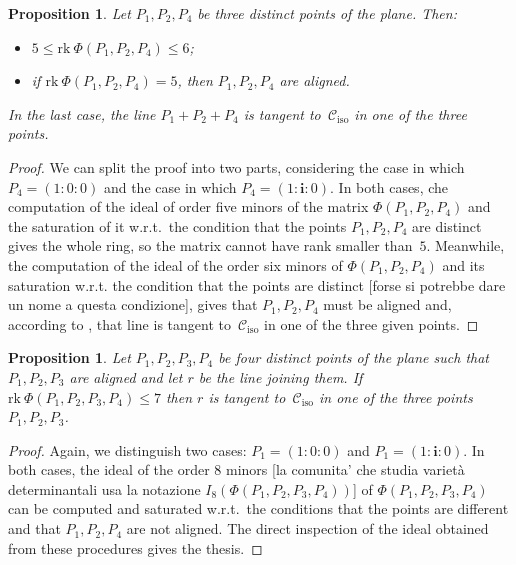 \documentclass[11pt, a4paper, reqno, captions=tableheading,bibliography=totoc]{scrartcl}
\theoremstyle{plain}
\newtheorem{prop}[lemma]{Proposition}
\theoremstyle{definition}
\newcommand{\iso}{\mathcal{C}_{\mathrm{iso}}}
\newcommand{\iii}{\textbf{i}}
\newcommand{\blue}[1]{{\color{blue}  [#1]}}
\newcommand{\rk}{\ensuremath{\mathrm{rk}}}
\begin{document}
\begin{prop}
\label{manca il riferimento su ancillary    non e': condition_rank_aligned}
Let $P_1, P_2, P_4$ be three distinct points of the plane. Then:
\begin{itemize}
\item $5 \leq \rk \ \Phi(P_1, P_2, P_4) \leq 6$;
\item if
$\rk \ \Phi(P_1, P_2, P_4) = 5$, then $P_1, P_2, P_4$
 are aligned.
\end{itemize}
In the last case, the line $P_1+P_2+P_4$ is tangent to~$\iso$
in one of the three points.
\end{prop}
\begin{proof}
We can split the proof into two parts, considering the case in
which $P_4 = (1: 0: 0)$ and the case in which $P_4 = (1: \iii: 0)$.
In both cases, che computation of the ideal of order five minors of the matrix
$\Phi(P_1, P_2, P_4)$ and the saturation of it w.r.t.\ the condition
that the points $P_1, P_2, P_4$ are distinct gives the whole ring, so
the matrix cannot have rank smaller than~$5$. Meanwhile, the computation
of the ideal of the order six minors of $\Phi(P_1, P_2, P_4)$ and its
saturation w.r.t. the condition that the points are distinct \blue{forse si potrebbe dare un nome a questa condizione}, gives that
$P_1, P_2, P_4$ must be aligned and, according to ,
that line is tangent to~$\iso$ in one of the three given points.
\end{proof}


\begin{prop}
\label{prop:condition3+1}
Let $P_1, P_2, P_3, P_4$ be four distinct points of the plane such that
$P_1, P_2, P_3$ are aligned and let $r$
be the line joining them. If
$\rk \ \Phi(P_1, P_2, P_3, P_4) \leq 7$ then $r$ is tangent to~$\iso$ in one of the three points $P_1, P_2, P_3$.
\end{prop}
\begin{proof}
Again, we distinguish two cases: $P_1 = (1: 0: 0)$ and
$P_1 = (1: \iii: 0)$. In both cases, the ideal of the order $8$
minors \blue {la comunita' che studia varietà determinantali usa la notazione $I_8(\Phi(P_1, P_2, P_3, P_4))$} of $\Phi(P_1, P_2, P_3, P_4)$ can be computed and saturated
w.r.t.\ the conditions that the points are different and that
$P_1, P_2, P_4$ are not aligned.
The direct inspection of the ideal obtained from these procedures gives the thesis.
\end{proof}
\end{document}

